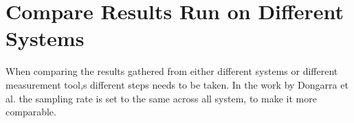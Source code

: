 
\section{Compare Results Run on Different Systems}

When comparing the results gathered from either different systems or different measurement tool,s different steps needs to be taken. In the work by Dongarra et al.\cite*[]{Dongarra2012} the sampling rate is set to the same across all system, to make it more comparable.